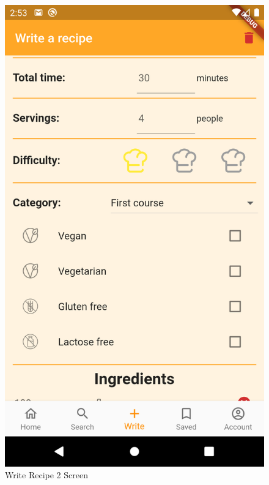 \begin{figure}[H]
\begin{minipage}{0.31\textwidth}
		\centering
		\includegraphics{img/Write_2.png}
		\caption{Write Recipe 2 Screen}
	\end{minipage}\hfill
	\begin{minipage}{0.31\textwidth}
		\centering

\end{minipage}
\end{figure}
